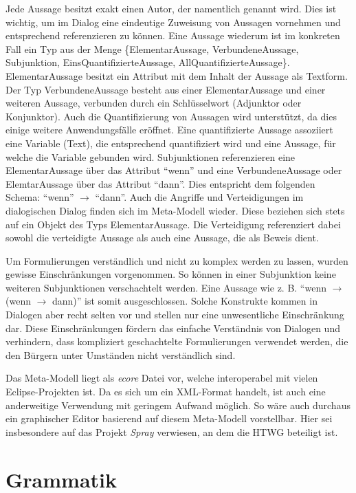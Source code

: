 \documentclass[11pt,a4paper,bibtotocnumbered]{scrreprt}
\begin{document}
Jede Aussage besitzt exakt einen Autor, der namentlich genannt wird.
Dies ist wichtig, um im Dialog eine eindeutige Zuweisung von Aussagen vornehmen und entsprechend referenzieren zu können.
Eine Aussage wiederum ist im konkreten Fall ein Typ aus der Menge \{ElementarAussage, VerbundeneAussage, Subjunktion, EinsQuantifizierteAussage, AllQuantifizierteAussage\}. 
ElementarAussage besitzt ein Attribut mit dem Inhalt der Aussage als Textform.
Der Typ VerbundeneAussage besteht aus einer ElementarAussage und einer weiteren Aussage, verbunden durch ein Schlüsselwort (Adjunktor oder Konjunktor).
Auch die Quantifizierung von Aussagen wird unterstützt, da dies einige weitere Anwendungsfälle eröffnet.
Eine quantifizierte Aussage assoziiert eine Variable (Text), die entsprechend quantifiziert wird und eine Aussage, für welche die Variable gebunden wird.
Subjunktionen referenzieren eine ElementarAussage über das Attribut \enquote{wenn} und eine VerbundeneAussage oder ElemtarAussage über das Attribut \enquote{dann}.
Dies entspricht dem folgenden Schema: \enquote{wenn} $\rightarrow$ \enquote{dann}.
Auch die Angriffe und Verteidigungen im dialogischen Dialog finden sich im Meta-Modell wieder. 
Diese beziehen sich stets auf ein Objekt des Typs ElementarAussage.
Die Verteidigung referenziert dabei sowohl die verteidigte Aussage als auch eine Aussage, die als Beweis dient.

Um Formulierungen verständlich und nicht zu komplex werden zu lassen, wurden gewisse Einschränkungen vorgenommen. 
So können in einer Subjunktion keine weiteren Subjunktionen verschachtelt werden.
Eine Aussage wie z. B. \enquote{wenn $\rightarrow$ (wenn $\rightarrow$ dann)} ist somit ausgeschlossen.
Solche Konstrukte kommen in Dialogen aber recht selten vor und stellen nur eine unwesentliche Einschränkung dar.
Diese Einschränkungen fördern das einfache Verständnis von Dialogen und verhindern, dass kompliziert geschachtelte Formulierungen verwendet werden, die den Bürgern unter Umständen nicht verständlich sind.

Das Meta-Modell liegt als \emph{ecore} Datei vor, welche interoperabel mit vielen Eclipse-Projekten ist. 
Da es sich um ein XML-Format handelt, ist auch eine anderweitige Verwendung mit geringem Aufwand möglich.
So wäre auch durchaus ein graphischer Editor basierend auf diesem Meta-Modell vorstellbar.
Hier sei insbesondere auf das Projekt \emph{Spray} verwiesen, an dem die HTWG beteiligt ist.

\section{Grammatik}
\end{document}
